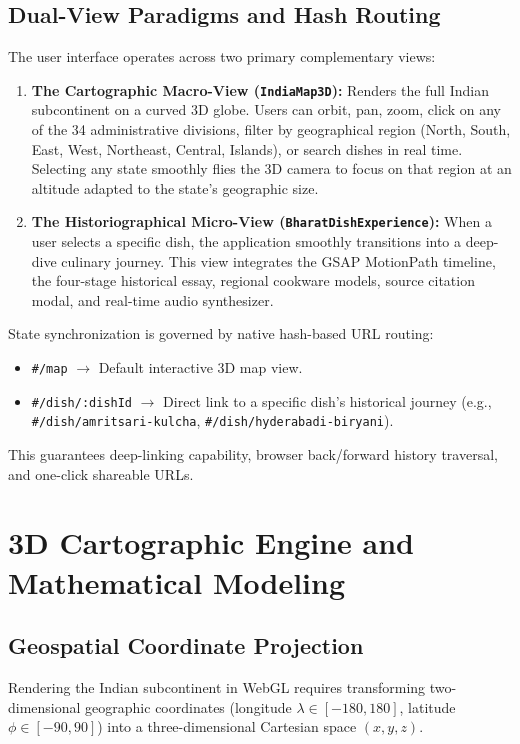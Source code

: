 \documentclass[11pt,a4paper]{report}
\begin{document}
\section{Dual-View Paradigms and Hash Routing}
The user interface operates across two primary complementary views:
\begin{enumerate}
    \item \textbf{The Cartographic Macro-View (\texttt{IndiaMap3D}):} Renders the full Indian subcontinent on a curved 3D globe. Users can orbit, pan, zoom, click on any of the 34 administrative divisions, filter by geographical region (North, South, East, West, Northeast, Central, Islands), or search dishes in real time. Selecting any state smoothly flies the 3D camera to focus on that region at an altitude adapted to the state's geographic size.
    \item \textbf{The Historiographical Micro-View (\texttt{BharatDishExperience}):} When a user selects a specific dish, the application smoothly transitions into a deep-dive culinary journey. This view integrates the GSAP MotionPath timeline, the four-stage historical essay, regional cookware models, source citation modal, and real-time audio synthesizer.
\end{enumerate}

State synchronization is governed by native hash-based URL routing:
\begin{itemize}
    \item \texttt{\#/map} $\longrightarrow$ Default interactive 3D map view.
    \item \texttt{\#/dish/:dishId} $\longrightarrow$ Direct link to a specific dish's historical journey (e.g., \texttt{\#/dish/amritsari-kulcha}, \texttt{\#/dish/hyderabadi-biryani}).
\end{itemize}
This guarantees deep-linking capability, browser back/forward history traversal, and one-click shareable URLs.

\chapter{3D Cartographic Engine and Mathematical Modeling}

\section{Geospatial Coordinate Projection}
Rendering the Indian subcontinent in WebGL requires transforming two-dimensional geographic coordinates (longitude $\lambda \in [-180, 180]$, latitude $\phi \in [-90, 90]$) into a three-dimensional Cartesian space $(x, y, z)$.
\end{document}
